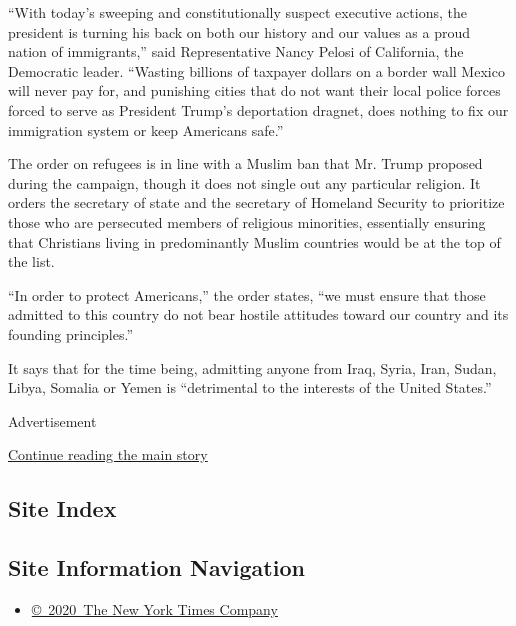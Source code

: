 ``With today's sweeping and constitutionally suspect executive actions,
the president is turning his back on both our history and our values as
a proud nation of immigrants,'' said Representative Nancy Pelosi of
California, the Democratic leader. ``Wasting billions of taxpayer
dollars on a border wall Mexico will never pay for, and punishing cities
that do not want their local police forces forced to serve as President
Trump's deportation dragnet, does nothing to fix our immigration system
or keep Americans safe.''

The order on refugees is in line with a Muslim ban that Mr. Trump
proposed during the campaign, though it does not single out any
particular religion. It orders the secretary of state and the secretary
of Homeland Security to prioritize those who are persecuted members of
religious minorities, essentially ensuring that Christians living in
predominantly Muslim countries would be at the top of the list.

``In order to protect Americans,'' the order states, ``we must ensure
that those admitted to this country do not bear hostile attitudes toward
our country and its founding principles.''

It says that for the time being, admitting anyone from Iraq, Syria,
Iran, Sudan, Libya, Somalia or Yemen is ``detrimental to the interests
of the United States.''

Advertisement

\protect\hyperlink{after-bottom}{Continue reading the main story}

\hypertarget{site-index}{%
\subsection{Site Index}\label{site-index}}

\hypertarget{site-information-navigation}{%
\subsection{Site Information
Navigation}\label{site-information-navigation}}

\begin{itemize}
\tightlist
\item
  \href{https://help.nytimes.com/hc/en-us/articles/115014792127-Copyright-notice}{©~2020~The
  New York Times Company}
\end{itemize}

